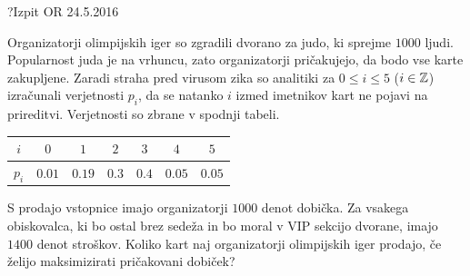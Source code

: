 \begin{naloga}{?}{Izpit OR 24.5.2016}
\begin{vprasanje}[judo]
Organizatorji olimpijskih iger so zgradili dvorano za judo,
ki sprejme $1000$ ljudi.
Popularnost juda je na vrhuncu,
zato organizatorji pričakujejo, da bodo vse karte zakupljene.
Zaradi straha pred virusom zika so analitiki
za $0 \le i \le 5$ ($i \in \mathbb{Z}$) izračunali verjetnosti $p_i$,
da se natanko $i$ izmed imetnikov kart ne pojavi na prireditvi.
Verjetnosti so zbrane v spodnji tabeli.
\begin{center}
\begin{tabular}{c|cccccc}
$i$   & $0$    & $1$    & $2$   & $3$   & $4$    & $5$ \\ \hline
$p_i$ & $0.01$ & $0.19$ & $0.3$ & $0.4$ & $0.05$ & $0.05$
\end{tabular}
\end{center}

S prodajo vstopnice imajo organizatorji $1000$ denot dobička.
Za vsakega obiskovalca,
ki bo ostal brez sedeža in bo moral v VIP sekcijo dvorane,
imajo $1400$ denot stroškov.
Koliko kart naj organizatorji olimpijskih iger prodajo,
če želijo maksimizirati pričakovani dobiček?
\end{vprasanje}
\begin{odgovor}
\end{odgovor}
\end{naloga}
